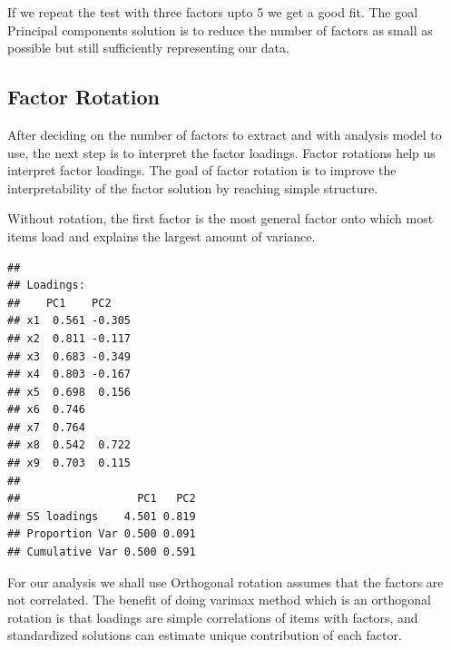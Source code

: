 \documentclass[
]{article}
\newenvironment{Shaded}{\begin{snugshade}}{\end{snugshade}}
\newcommand{\AttributeTok}[1]{\textcolor[rgb]{0.77,0.63,0.00}{#1}}
\newcommand{\DecValTok}[1]{\textcolor[rgb]{0.00,0.00,0.81}{#1}}
\newcommand{\FunctionTok}[1]{\textcolor[rgb]{0.00,0.00,0.00}{#1}}
\newcommand{\NormalTok}[1]{#1}
\newcommand{\OtherTok}[1]{\textcolor[rgb]{0.56,0.35,0.01}{#1}}
\newcommand{\SpecialCharTok}[1]{\textcolor[rgb]{0.00,0.00,0.00}{#1}}
\newcommand{\StringTok}[1]{\textcolor[rgb]{0.31,0.60,0.02}{#1}}
\begin{document}
If we repeat the test with three factors upto 5 we get a good fit. The
goal Principal components solution is to reduce the number of factors as
small as possible but still sufficiently representing our data.

\hypertarget{factor-rotation}{%
\subsection{Factor Rotation}\label{factor-rotation}}

After deciding on the number of factors to extract and with analysis
model to use, the next step is to interpret the factor loadings. Factor
rotations help us interpret factor loadings. The goal of factor rotation
is to improve the interpretability of the factor solution by reaching
simple structure.

Without rotation, the first factor is the most general factor onto which
most items load and explains the largest amount of variance.

\begin{Shaded}
\end{Shaded}

\begin{verbatim}
## 
## Loadings:
##    PC1    PC2   
## x1  0.561 -0.305
## x2  0.811 -0.117
## x3  0.683 -0.349
## x4  0.803 -0.167
## x5  0.698  0.156
## x6  0.746       
## x7  0.764       
## x8  0.542  0.722
## x9  0.703  0.115
## 
##                  PC1   PC2
## SS loadings    4.501 0.819
## Proportion Var 0.500 0.091
## Cumulative Var 0.500 0.591
\end{verbatim}

For our analysis we shall use Orthogonal rotation assumes that the
factors are not correlated. The benefit of doing varimax method which is
an orthogonal rotation is that loadings are simple correlations of items
with factors, and standardized solutions can estimate unique
contribution of each factor.

\begin{Shaded}
\end{Shaded}
\end{document}
